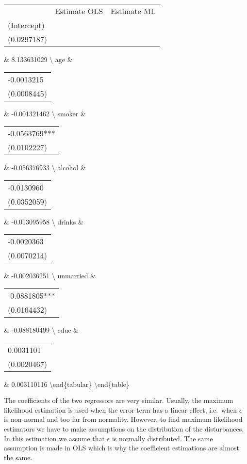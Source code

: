 \documentclass[
]{article}
\begin{document}
\begin{tabular}{lll}
            & Estimate OLS                                                        & Estimate ML  \\
(Intercept) & \begin{tabular}[c]{@{}l@{}}8.1336310***\\ (0.0297187)\end{tabular}

\& 8.133631029 \textbackslash{} age \&

\begin{tabular}[c]{@{}l@{}}-0.0013215\\ (0.0008445)\end{tabular}

\& -0.001321462 \textbackslash{} smoker \&

\begin{tabular}[c]{@{}l@{}}-0.0563769***\\ (0.0102227)\end{tabular}

\& -0.056376933 \textbackslash{} alcohol \&

\begin{tabular}[c]{@{}l@{}}-0.0130960\\ (0.0352059)\end{tabular}

\& -0.013095958 \textbackslash{} drinks \&

\begin{tabular}[c]{@{}l@{}}-0.0020363\\ (0.0070214)\end{tabular}

\& -0.002036251 \textbackslash{} unmarried \&

\begin{tabular}[c]{@{}l@{}}-0.0881805***\\ (0.0104432)\end{tabular}

\& -0.088180499 \textbackslash{} educ \&

\begin{tabular}[c]{@{}l@{}}0.0031101\\ (0.0020467)\end{tabular}

\& 0.003110116 \textbackslash end\{tabular\} \textbackslash end\{table\}

The coefficients of the two regressors are very similar. Usually, the
maximum likelihood estimation is used when the error term has a linear
effect, i.e.~when \(\epsilon\) is non-normal and too far from normality.
However, to find maximum likelihood estimators we have to make
assumptions on the distribution of the disturbances. In this estimation
we assume that \(\epsilon\) is normally distributed. The same assumption
is made in OLS which is why the coefficient estimations are almost the
same.
\end{document}

